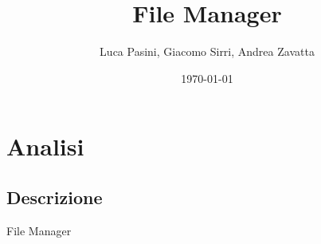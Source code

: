 \documentclass[a4paper,12pt]{report}
\title{File Manager}
\author{Luca Pasini, Giacomo Sirri, Andrea Zavatta}
\date{\today}
\begin{document}
\maketitle

\tableofcontents

\chapter{Analisi}

\section{Descrizione}

File Manager
\end{document}
